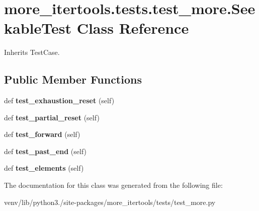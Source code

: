 \hypertarget{classmore__itertools_1_1tests_1_1test__more_1_1_seekable_test}{}\section{more\+\_\+itertools.\+tests.\+test\+\_\+more.\+Seekable\+Test Class Reference}
\label{classmore__itertools_1_1tests_1_1test__more_1_1_seekable_test}


Inherits Test\+Case.

\subsection*{Public Member Functions}
\begin{DoxyCompactItemize}
\item 
\mbox{\label{classmore__itertools_1_1tests_1_1test__more_1_1_seekable_test_a190b17fee67681cc7136de8bbefb81cf}} 
def {\bfseries test\+\_\+exhaustion\+\_\+reset} (self)
\item 
\mbox{\label{classmore__itertools_1_1tests_1_1test__more_1_1_seekable_test_a4bab66fbecbb14c2371c430c327dcb23}} 
def {\bfseries test\+\_\+partial\+\_\+reset} (self)
\item 
\mbox{\label{classmore__itertools_1_1tests_1_1test__more_1_1_seekable_test_a66d9ace8d1dccb94ef5527aefb04e1fc}} 
def {\bfseries test\+\_\+forward} (self)
\item 
\mbox{\label{classmore__itertools_1_1tests_1_1test__more_1_1_seekable_test_ab70d73f6dfc350e31fe25e4a38050a6f}} 
def {\bfseries test\+\_\+past\+\_\+end} (self)
\item 
\mbox{\label{classmore__itertools_1_1tests_1_1test__more_1_1_seekable_test_a4f0bf8fc427edef436d71d09ac80b2e9}} 
def {\bfseries test\+\_\+elements} (self)
\end{DoxyCompactItemize}


The documentation for this class was generated from the following file\+:\begin{DoxyCompactItemize}
\item 
venv/lib/python3./site-\/packages/more\+\_\+itertools/tests/test\+\_\+more.\+py\end{DoxyCompactItemize}
